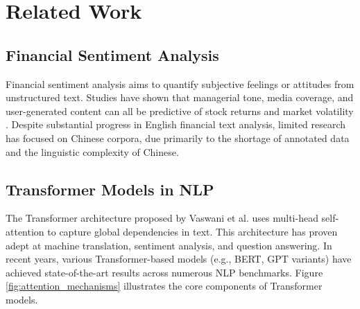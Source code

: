 \documentclass[12pt]{article}
\begin{document}
\section{Related Work}
\label{sec:relatedwork}

\subsection{Financial Sentiment Analysis}
Financial sentiment analysis aims to quantify subjective feelings or attitudes from unstructured text. Studies have shown that managerial tone, media coverage, and user-generated content can all be predictive of stock returns and market volatility \cite{ref3, ref4}. Despite substantial progress in English financial text analysis, limited research has focused on Chinese corpora, due primarily to the shortage of annotated data and the linguistic complexity of Chinese.

\subsection{Transformer Models in NLP}
The Transformer architecture proposed by Vaswani et al. \cite{ref1} uses multi-head self-attention to capture global dependencies in text. This architecture has proven adept at machine translation, sentiment analysis, and question answering. In recent years, various Transformer-based models (e.g., BERT, GPT variants) have achieved state-of-the-art results across numerous NLP benchmarks. Figure \ref{fig:attention_mechanisms} illustrates the core components of Transformer models.
\end{document}
